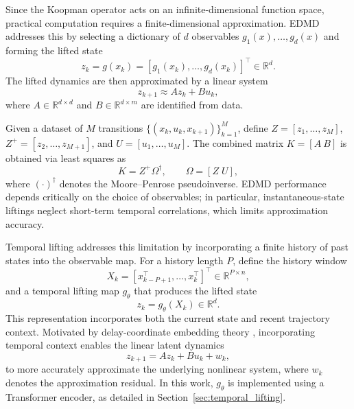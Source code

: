 \documentclass[journal]{IEEEtran}
\begin{document}
Since the Koopman operator acts on an infinite-dimensional function space, practical computation requires a finite-dimensional approximation. EDMD addresses this by selecting a dictionary of $d$ observables $g_1(x),\ldots,g_d(x)$ and forming the lifted state
\begin{equation}
    z_k = g(x_k) = [g_1(x_k), \ldots, g_d(x_k)]^\top \in \mathbb{R}^d.
    \label{eq:instantaneous_lifting}
\end{equation}
The lifted dynamics are then approximated by a linear system
\begin{equation}
    z_{k+1} \approx A z_k + B u_k,
    \label{eq:edmd_dynamics}
\end{equation}
where $A \in \mathbb{R}^{d \times d}$ and $B \in \mathbb{R}^{d \times m}$ are identified from data. 

Given a dataset of $M$ transitions $\{(x_k, u_k, x_{k+1})\}_{k=1}^M$, define $Z = [z_1,\ldots,z_M]$, $Z^+ = [z_2,\ldots,z_{M+1}]$, and $U = [u_1,\ldots,u_M]$. The combined matrix $K = [A\ B]$ is obtained via least squares as
\begin{equation}
    K = Z^+ \Omega^\dagger, \qquad \Omega = [Z\; U],
    \label{eq:edmd_regression}
\end{equation}
where $(\cdot)^\dagger$ denotes the Moore--Penrose pseudoinverse. EDMD performance depends critically on the choice of observables; in particular, instantaneous-state liftings neglect short-term temporal correlations, which limits approximation accuracy.

Temporal lifting addresses this limitation by incorporating a finite history of past states into the observable map. For a history length $P$, define the history window
\begin{equation}
    X_k = [x_{k-P+1}^\top, \ldots, x_k^\top]^\top \in \mathbb{R}^{P\times n},
    \label{eq:history_window}
\end{equation}
and a temporal lifting map $g_\theta$ that produces the lifted state
\begin{equation}
    z_k = g_\theta(X_k) \in \mathbb{R}^d.
    \label{eq:temporal_lifting}
\end{equation}
This representation incorporates both the current state and recent trajectory context. Motivated by delay-coordinate embedding theory \cite{arbabi2017ergodic, rank2019recurrent}, incorporating temporal context enables the linear latent dynamics
\begin{equation}
    z_{k+1} = A z_k + B u_k + w_k,
    \label{eq:lifted_dynamics_prelim}
\end{equation}
to more accurately approximate the underlying nonlinear system, where $w_k$ denotes the approximation residual. In this work, $g_\theta$ is implemented using a Transformer encoder, as detailed in Section~\ref{sec:temporal_lifting}.
\end{document}
